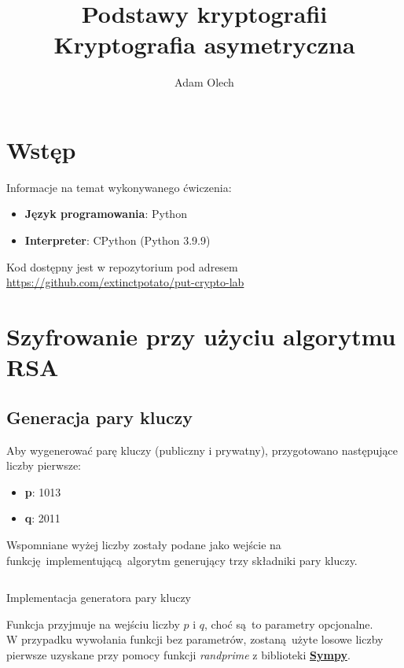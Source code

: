 \documentclass[12pt]{article}
\title{Podstawy kryptografii \\ \large Kryptografia asymetryczna}
\author{Adam Olech}
\begin{document}
\maketitle

\tableofcontents
\newpage

\section{Wstęp}

Informacje na temat wykonywanego ćwiczenia:

\begin{itemize}
	\item \textbf{Język programowania}: Python
	\item \textbf{Interpreter}: CPython (Python 3.9.9)
\end{itemize}

Kod dostępny jest w repozytorium pod adresem \url{https://github.com/extinctpotato/put-crypto-lab}

\section{Szyfrowanie przy użyciu algorytmu RSA}

\subsection{Generacja pary kluczy}

Aby wygenerować parę kluczy (publiczny i prywatny), 
przygotowano następujące liczby pierwsze:

\begin{itemize}
	\item \textbf{p}: 1013
	\item \textbf{q}: 2011
\end{itemize}

Wspomniane wyżej liczby zostały podane jako wejście na
funkcję implementującą algorytm generujący trzy składniki pary kluczy.

\begin{listing}[H]
	\inputminted[firstline=54,lastline=73]{python}{../rsa.py}
	\caption{Implementacja generatora pary kluczy}
\end{listing}

Funkcja przyjmuje na wejściu liczby $p$ i $q$, choć są to parametry opcjonalne.
\\

W przypadku wywołania funkcji bez parametrów, zostaną użyte losowe liczby
pierwsze uzyskane przy pomocy funkcji 
\textit{randprime} z biblioteki \textbf{\href{https://www.sympy.org}{Sympy}}.
\end{document}
